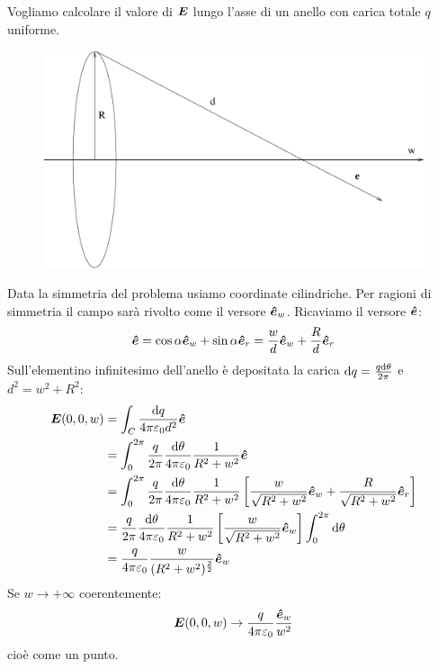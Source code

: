 \begin{Es}[Anello]
\label{es:anello}
Vogliamo calcolare il valore di $\boldsymbol{E}$ lungo l'asse di un anello con carica totale $q$ uniforme.
\begin{figure}[htbp]
\centering
\includegraphics[scale=0.45]{immagini/fisica2/anello}
\end{figure}
Data la simmetria del problema usiamo coordinate cilindriche. Per ragioni di simmetria il campo sarà rivolto come il versore $\boldsymbol{\hat {e}}_w$. Ricaviamo il versore $\boldsymbol{\hat {e}}$:
\begin{equation*}\boldsymbol{\hat {e}}=\cos\alpha\boldsymbol{\hat {e}}_w+\sin\alpha\boldsymbol{\hat {e}}_r=\frac{w}{d}\boldsymbol{\hat {e}}_w+\frac{R}{d}\boldsymbol{\hat {e}}_r\end{equation*}
Sull'elementino infinitesimo dell'anello è depositata la carica $\mathrm{d} q=\frac{q \mathrm{d} \theta}{2\pi}$ e $d^2=w^2+R^2$:
\begin{align*}
\boldsymbol{E}(0,0,w)&=\int_C\frac{\mathrm{d} q}{4\pi\varepsilon_0d^2}\boldsymbol{\hat {e}}\\
&=\int_0^{2\pi}\frac{q}{2\pi}\frac{\mathrm{d}\theta}{4\pi\varepsilon_0}\frac{1}{R^2+w^2}\boldsymbol{\hat {e}}\\
&=\int_0^{2\pi}\frac{q}{2\pi}\frac{\mathrm{d}\theta}{4\pi\varepsilon_0}\frac{1}{R^2+w^2}\left[\frac{w}{\sqrt{R^2+w^2}}\boldsymbol{\hat {e}}_w+\frac{R}{\sqrt{R^2+w^2}}\boldsymbol{\hat {e}}_r\right]\\
&=\frac{q}{2\pi}\frac{\mathrm{d}\theta}{4\pi\varepsilon_0}\frac{1}{R^2+w^2}\left[\frac{w}{\sqrt{R^2+w^2}}\boldsymbol{\hat {e}}_w\right]\int_0^{2\pi}\mathrm{d}\theta\\
&=\frac{q}{4\pi\varepsilon_0}\frac{w}{(R^2+w^2)^{\frac{3}{2}}}\boldsymbol{\hat {e}}_w\\
\end{align*}
Se $w\to +\infty$ coerentemente:
\begin{equation*}\boldsymbol{E}(0,0,w)\to\frac{q}{4\pi\varepsilon_0}\frac{\boldsymbol{\hat {e}}_w}{w^2}\end{equation*}
cioè come un punto.
\end{Es}
